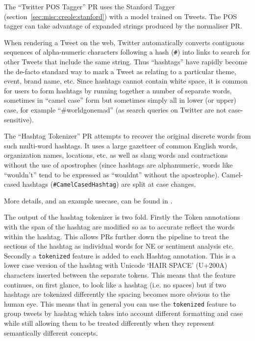 The ``Twitter POS Tagger'' PR uses the Stanford Tagger
(section~\ref{sec:misc:creole:stanford}) with a model trained on Tweets.  The
POS tagger can take advantage of expanded strings produced by the normaliser
PR.


When rendering a Tweet on the web, Twitter automatically converts contiguous
sequences of alpha-numeric characters following a hash (\verb!#!) into links
to search for other Tweets that include the same string.  Thus ``hashtags''
have rapidly become the de-facto standard way to mark a Tweet as relating to a
particular theme, event, brand name, etc.  Since hashtags cannot contain white
space, it is common for users to form hashtags by running together a number of
separate words, sometimes in ``camel case'' form but sometimes simply all in
lower (or upper) case, for example ``\#worldgonemad'' (as search queries on
Twitter are not case-sensitive).

The ``Hashtag Tokenizer'' PR attempts to recover the original discrete words
from such multi-word hashtags.  It uses a large gazetteer of common English
words, organization names, locations, etc. as well as slang words and
contractions without the use of apostrophes (since hashtags are alphanumeric,
words like ``wouldn't'' tend to be expressed as ``wouldnt'' without the
apostrophe).  Camel-cased hashtags (\verb!#CamelCasedHashtag!) are split at
case changes.

More details, and an example usecase, can be found in \cite{Maynard14a}.

The output of the hashtag tokenizer is two fold. Firstly the Token annotations
with the span of the hashtag are modified so as to accurate reflect the words
within the hashtag. This allows PRs further down the pipeline to treat the
sections of the hashtag as individual words for NE or sentiment analysis etc.
Secondly a \verb|tokenized| feature is added to each Hashtag annotation. This
is a lower case version of the hashtag with Unicode `HAIR SPACE' (U+200A) characters
inserted between the separate tokens. This means that the feature continues,
on first glance, to look like a hashtag (i.e. no spaces) but if two hashtags
are tokenized differently the spacing becomes more obvious to the human eye.
This means that in general you can use the \verb|tokenized| feature to group
tweets by hashtag which takes into account different formatting and case
while still allowing them to be treated differently when they represent
semantically different concepts.

